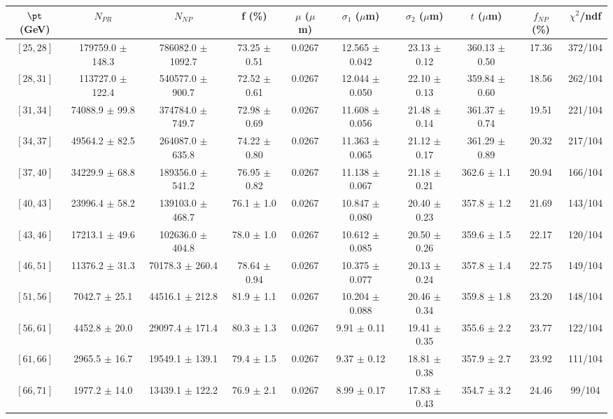 \begin{tabular}{c||c|c|c|c|c|c|c||c|c}
$\pt$ (GeV) & $N_{PR}$ & $N_{NP}$ & f (\%) & $\mu$ ($\mu$m) & $\sigma_1$ ($\mu$m) & $\sigma_2$ ($\mu$m)  & $t$ ($\mu$m) & $f_{NP}$ (\%) & $\chi^2$/ndf \\
\hline
$[25, 28]$ & 179759.0 $\pm$ 148.3 & 786082.0 $\pm$ 1092.7 & 73.25 $\pm$ 0.51 & 0.0267 & 12.565 $\pm$ 0.042 & 23.13 $\pm$ 0.12 & 360.13 $\pm$ 0.50 & 17.36 & 372/104\\
$[28, 31]$ & 113727.0 $\pm$ 122.4 & 540577.0 $\pm$ 900.7 & 72.52 $\pm$ 0.61 & 0.0267 & 12.044 $\pm$ 0.050 & 22.10 $\pm$ 0.13 & 359.84 $\pm$ 0.60 & 18.56 & 262/104\\
$[31, 34]$ & 74088.9 $\pm$ 99.8 & 374784.0 $\pm$ 749.7 & 72.98 $\pm$ 0.69 & 0.0267 & 11.608 $\pm$ 0.056 & 21.48 $\pm$ 0.14 & 361.37 $\pm$ 0.74 & 19.51 & 221/104\\
$[34, 37]$ & 49564.2 $\pm$ 82.5 & 264087.0 $\pm$ 635.8 & 74.22 $\pm$ 0.80 & 0.0267 & 11.363 $\pm$ 0.065 & 21.12 $\pm$ 0.17 & 361.29 $\pm$ 0.89 & 20.32 & 217/104\\
$[37, 40]$ & 34229.9 $\pm$ 68.8 & 189356.0 $\pm$ 541.2 & 76.95 $\pm$ 0.82 & 0.0267 & 11.138 $\pm$ 0.067 & 21.18 $\pm$ 0.21 & 362.6 $\pm$ 1.1 & 20.94 & 166/104\\
$[40, 43]$ & 23996.4 $\pm$ 58.2 & 139103.0 $\pm$ 468.7 & 76.1 $\pm$ 1.0 & 0.0267 & 10.847 $\pm$ 0.080 & 20.40 $\pm$ 0.23 & 357.8 $\pm$ 1.2 & 21.69 & 143/104\\
$[43, 46]$ & 17213.1 $\pm$ 49.6 & 102636.0 $\pm$ 404.8 & 78.0 $\pm$ 1.0 & 0.0267 & 10.612 $\pm$ 0.085 & 20.50 $\pm$ 0.26 & 359.6 $\pm$ 1.5 & 22.17 & 120/104\\
$[46, 51]$ & 11376.2 $\pm$ 31.3 & 70178.3 $\pm$ 260.4 & 78.64 $\pm$ 0.94 & 0.0267 & 10.375 $\pm$ 0.077 & 20.13 $\pm$ 0.24 & 357.8 $\pm$ 1.4 & 22.75 & 149/104\\
$[51, 56]$ & 7042.7 $\pm$ 25.1 & 44516.1 $\pm$ 212.8 & 81.9 $\pm$ 1.1 & 0.0267 & 10.204 $\pm$ 0.088 & 20.46 $\pm$ 0.34 & 359.8 $\pm$ 1.8 & 23.20 & 148/104\\
$[56, 61]$ & 4452.8 $\pm$ 20.0 & 29097.4 $\pm$ 171.4 & 80.3 $\pm$ 1.3 & 0.0267 & 9.91 $\pm$ 0.11 & 19.41 $\pm$ 0.35 & 355.6 $\pm$ 2.2 & 23.77 & 122/104\\
$[61, 66]$ & 2965.5 $\pm$ 16.7 & 19549.1 $\pm$ 139.1 & 79.4 $\pm$ 1.5 & 0.0267 & 9.37 $\pm$ 0.12 & 18.81 $\pm$ 0.38 & 357.9 $\pm$ 2.7 & 23.92 & 111/104\\
$[66, 71]$ & 1977.2 $\pm$ 14.0 & 13439.1 $\pm$ 122.2 & 76.9 $\pm$ 2.1 & 0.0267 & 8.99 $\pm$ 0.17 & 17.83 $\pm$ 0.43 & 354.7 $\pm$ 3.2 & 24.46 & 99/104\\

\end{tabular}
